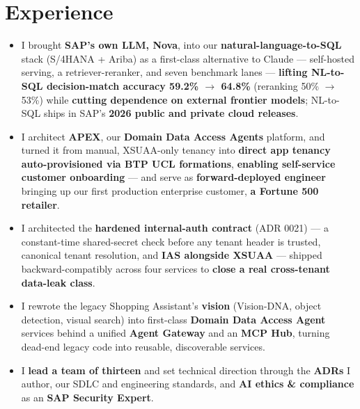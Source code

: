 \section{Experience}

\begin{itemize}
  \item I brought \textbf{SAP's own LLM, Nova}, into our \textbf{natural-language-to-SQL} stack
  (S/4HANA + Ariba) as a first-class alternative to Claude --- self-hosted serving, a
  retriever-reranker, and seven benchmark lanes --- \textbf{lifting NL-to-SQL decision-match accuracy
  59.2\% $\rightarrow$ 64.8\%} (reranking 50\% $\rightarrow$ 53\%) while \textbf{cutting dependence on
  external frontier models}; NL-to-SQL ships in SAP's \textbf{2026 public and private cloud releases}.
  \item I architect \textbf{APEX}, our \textbf{Domain Data Access Agents} platform, and turned it from
  manual, XSUAA-only tenancy into \textbf{direct app tenancy auto-provisioned via BTP UCL formations},
  \textbf{enabling self-service customer onboarding} --- and serve as \textbf{forward-deployed engineer}
  bringing up our first production enterprise customer, \textbf{a Fortune 500 retailer}.
  \item I architected the \textbf{hardened internal-auth contract} (ADR 0021) --- a constant-time
  shared-secret check before any tenant header is trusted, canonical tenant resolution, and
  \textbf{IAS alongside XSUAA} --- shipped backward-compatibly across four services to \textbf{close a
  real cross-tenant data-leak class}.
  \item I rewrote the legacy Shopping Assistant's \textbf{vision} (Vision-DNA, object detection, visual
  search) into first-class \textbf{Domain Data Access Agent} services behind a unified \textbf{Agent
  Gateway} and an \textbf{MCP Hub}, turning dead-end legacy code into reusable, discoverable services.
  \item I \textbf{lead a team of thirteen} and set technical direction through the \textbf{ADRs} I
  author, our SDLC and engineering standards, and \textbf{AI ethics \& compliance} as an
  \textbf{SAP Security Expert}.
\end{itemize}
